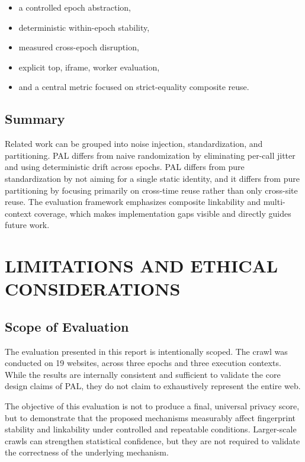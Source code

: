 \documentclass[11pt]{report}
\begin{document}
\begin{itemize}
    \item a controlled epoch abstraction,
    \item deterministic within-epoch stability,
    \item measured cross-epoch disruption,
    \item explicit top, iframe, worker evaluation,
    \item and a central metric focused on strict-equality composite reuse.
\end{itemize}

\section{Summary}

Related work can be grouped into noise injection, standardization, and partitioning. PAL differs from naive randomization by eliminating per-call jitter and using deterministic drift across epochs. PAL differs from pure standardization by not aiming for a single static identity, and it differs from pure partitioning by focusing primarily on cross-time reuse rather than only cross-site reuse. The evaluation framework emphasizes composite linkability and multi-context coverage, which makes implementation gaps visible and directly guides future work.

\clearpage










\chapter{LIMITATIONS AND ETHICAL CONSIDERATIONS}

\section{Scope of Evaluation}

The evaluation presented in this report is intentionally scoped. The crawl was conducted on 19 websites, across three epochs and three execution contexts. While the results are internally consistent and sufficient to validate the core design claims of PAL, they do not claim to exhaustively represent the entire web.

The objective of this evaluation is not to produce a final, universal privacy score, but to demonstrate that the proposed mechanisms measurably affect fingerprint stability and linkability under controlled and repeatable conditions. Larger-scale crawls can strengthen statistical confidence, but they are not required to validate the correctness of the underlying mechanism.
\end{document}
